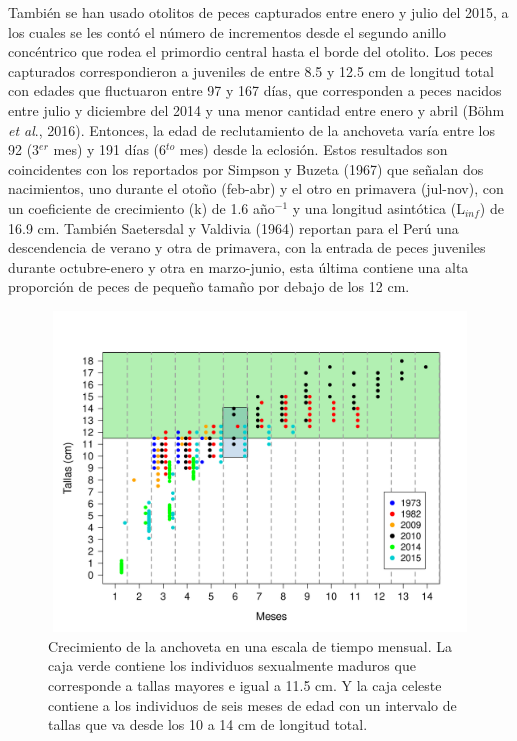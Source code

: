 \documentclass[letter,11pt]{article}
\begin{document}
Tambi\'en se han usado otolitos de peces capturados entre
enero y julio del 2015, a los cuales se les cont\'o el n\'umero de
incrementos desde el segundo anillo conc\'entrico que rodea el primordio
central hasta el borde del otolito. Los peces capturados correspondieron a
juveniles de entre 8.5 y 12.5 cm de longitud total con edades que fluctuaron
entre 97 y 167 d\'ias, que corresponden a peces nacidos entre julio y diciembre
del 2014 y una menor cantidad entre enero y abril (B\"ohm \textit{et al}., 2016).
Entonces, la edad de reclutamiento de la anchoveta var\'ia entre los 92
(3$^{er}$ mes) y 191 d\'ias (6$^{to}$ mes) desde la eclosi\'on. Estos resultados son
coincidentes con los reportados por Simpson y Buzeta (1967) que se\~{n}alan
dos nacimientos, uno durante el oto\~{n}o (feb-abr) y el otro en primavera
(jul-nov), con un coeficiente de crecimiento (k) de 1.6 a\~{n}o$^{-1}$ y
una longitud asint\'otica (L$_{inf}$) de 16.9 cm. Tambi\'en Saetersdal y
Valdivia (1964) reportan para el Per\'u una descendencia de verano y otra
de primavera, con la entrada de peces juveniles durante octubre-enero y
otra en marzo-junio, esta \'ultima contiene una alta proporci\'on de peces
de peque\~{n}o tama\~{n}o por debajo de los 12 cm.\\



\vspace{0.5cm}
\begin{figure}[htb!]
 \centering
 \includegraphics[width=15.5cm,height=8.5cm]{fig/figura04.pdf}
 \caption{Crecimiento de la anchoveta en una escala de tiempo mensual. La caja verde contiene los individuos sexualmente maduros que corresponde a tallas mayores e igual a 11.5 cm. Y la caja celeste contiene a los individuos de seis meses de edad con un intervalo de tallas que va desde los 10 a 14 cm de longitud total.}
 \label{Fig04}
\end{figure}
\vspace{0.5cm}
\end{document}
